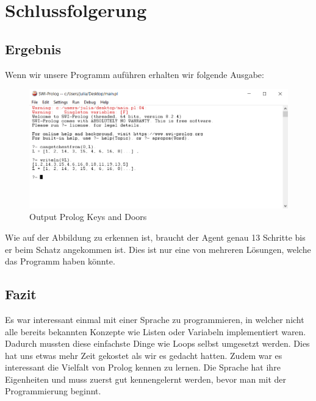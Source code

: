 \chapter{Schlussfolgerung}

\section{Ergebnis}
Wenn wir unsere Programm auführen erhalten wir folgende Ausgabe:

\begin{figure}[h]
    \begin{center}
        \includegraphics[width=1\textwidth]{content/pictures/output.png}
        \caption{Output Prolog Keys and Doors}
        \label{fig:output}
    \end{center}
\end{figure}

\noindent
Wie auf der Abbildung zu erkennen ist, braucht der Agent genau 13 Schritte bis
er beim Schatz angekommen ist. Dies ist nur eine von mehreren Lösungen, welche 
das Programm haben könnte.

\section{Fazit}
Es war interessant einmal mit einer Sprache zu programmieren, in welcher nicht alle
bereits bekannten Konzepte wie Listen oder Variabeln implementiert waren. Dadurch mussten 
diese einfachste Dinge wie Loops selbst umgesetzt werden. Dies hat uns etwas mehr Zeit gekostet
als wir es gedacht hatten. Zudem war es interessant die Vielfalt von Prolog kennen zu lernen.
Die Sprache hat ihre Eigenheiten und muss zuerst gut kennengelernt werden, bevor man mit der
Programmierung beginnt.  